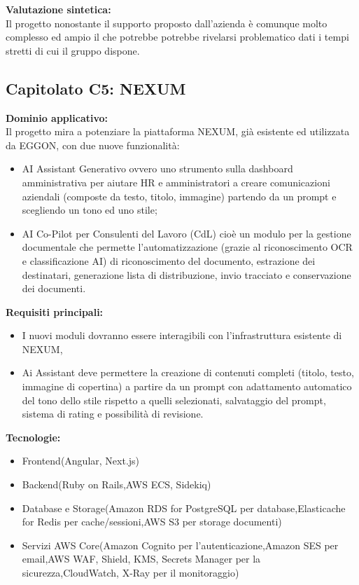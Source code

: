 \vspace{0.3cm}
\textbf{Valutazione sintetica:} \\
Il progetto nonostante il supporto proposto dall'azienda è comunque molto complesso ed ampio il che potrebbe potrebbe rivelarsi problematico dati i 
tempi stretti di cui il gruppo dispone.

\vspace{0.5cm}

\vspace{0.5cm}

\subsection{Capitolato C5: {NEXUM} }

\textbf{Dominio applicativo:} \\
{Il progetto mira a potenziare la piattaforma NEXUM, già esistente ed utilizzata da EGGON, con due nuove funzionalità:}
\begin{itemize}
    \item AI Assistant Generativo ovvero uno strumento sulla dashboard amministrativa per aiutare HR e amministratori a creare comunicazioni aziendali (composte da testo, titolo, immagine) partendo da un prompt e scegliendo un tono ed uno stile;
    \item AI Co-Pilot per Consulenti del Lavoro (CdL) cioè un modulo per la gestione documentale che permette l’automatizzazione (grazie al riconoscimento OCR e classificazione AI) di riconoscimento del documento, estrazione dei destinatari, generazione lista di distribuzione, invio tracciato e conservazione dei documenti.
\end{itemize}
\vspace{0.3cm}

\textbf{Requisiti principali:}
\begin{itemize}
	\item I nuovi moduli dovranno essere interagibili con l’infrastruttura esistente di NEXUM,
	\item Ai Assistant deve permettere la creazione di contenuti completi (titolo, testo, immagine di copertina) a partire da un prompt con adattamento automatico del tono dello stile rispetto a quelli selezionati, salvataggio del prompt, sistema di rating e possibilità di revisione.
\end{itemize}

\vspace{0.3cm}
\textbf{Tecnologie:}
\begin{itemize}
	\item {Frontend(Angular, Next.js)}
    \item {Backend(Ruby on Rails,AWS ECS, Sidekiq)}
    \item {Database e Storage(Amazon RDS for PostgreSQL per database,Elasticache for Redis per cache/sessioni,AWS S3 per storage documenti)}
    \item {Servizi AWS Core(Amazon Cognito per l’autenticazione,Amazon SES per email,AWS WAF, Shield, KMS, Secrets Manager per la sicurezza,CloudWatch, X-Ray per il monitoraggio)}
\end{itemize}

